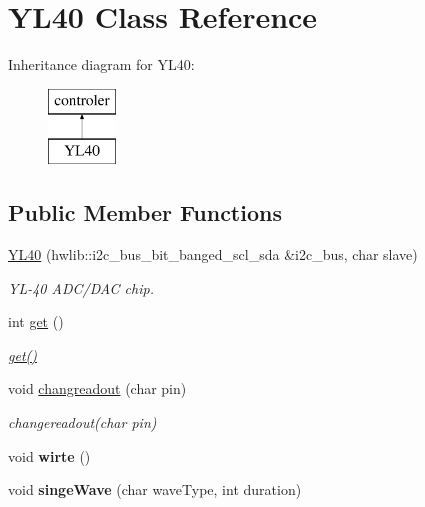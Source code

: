 \hypertarget{class_y_l40}{}\section{Y\+L40 Class Reference}
\label{class_y_l40}
Inheritance diagram for Y\+L40\+:\begin{figure}[H]
\begin{center}
\leavevmode
\includegraphics[height=2.000000cm]{class_y_l40}
\end{center}
\end{figure}
\subsection*{Public Member Functions}
\begin{DoxyCompactItemize}
\item 
\mbox{\hyperlink{class_y_l40_a5cbc98cfd60b1d4fd489dfa79254fd33}{Y\+L40}} (hwlib\+::i2c\+\_\+bus\+\_\+bit\+\_\+banged\+\_\+scl\+\_\+sda \&i2c\+\_\+bus, char slave)
\begin{DoxyCompactList}\small\item\em Y\+L-\/40 A\+D\+C/\+D\+AC chip. \end{DoxyCompactList}\item 
int \mbox{\hyperlink{class_y_l40_a3e0322c2c8c8dfed7466056173bc563e}{get}} ()
\begin{DoxyCompactList}\small\item\em \mbox{\hyperlink{class_y_l40_a3e0322c2c8c8dfed7466056173bc563e}{get()}} \end{DoxyCompactList}\item 
void \mbox{\hyperlink{class_y_l40_a97593c0f3ab5284c2a1258ed81f32d96}{changreadout}} (char pin)
\begin{DoxyCompactList}\small\item\em changereadout(char pin) \end{DoxyCompactList}\item 
\mbox{\label{class_y_l40_aec31472494c65121f87be43d9a12878e}} 
void {\bfseries wirte} ()
\item 
\mbox{\label{class_y_l40_a2f1f0be24016335020ff75ff36b5693f}} 
void {\bfseries singe\+Wave} (char wave\+Type, int duration)
\end{DoxyCompactItemize}


